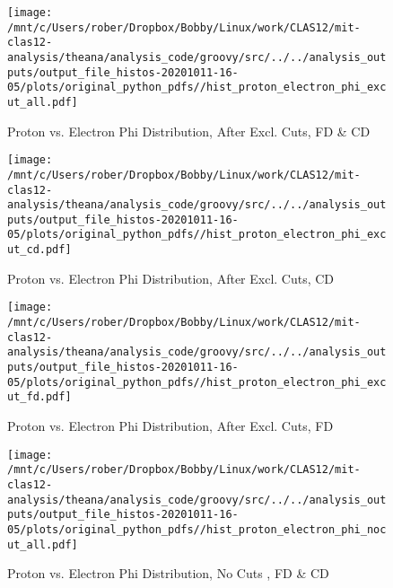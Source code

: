 \documentclass{article}
\begin{document}
\begin{landscape}
    \begin{figure}[h]
        \centering

        \texttt{[image: /mnt/c/Users/rober/Dropbox/Bobby/Linux/work/CLAS12/mit-clas12-analysis/theana/analysis\_code/groovy/src/../../analysis\_outputs/output\_file\_histos-20201011-16-05/plots/original\_python\_pdfs//hist\_proton\_electron\_phi\_excut\_all.pdf]}
        \captionsetup{textformat=empty,labelformat=blank}
        \caption{Proton vs. Electron Phi Distribution, After Excl. Cuts, FD \& CD}
    \end{figure}
    \clearpage
    
    \begin{figure}[h]
        \centering

        \texttt{[image: /mnt/c/Users/rober/Dropbox/Bobby/Linux/work/CLAS12/mit-clas12-analysis/theana/analysis\_code/groovy/src/../../analysis\_outputs/output\_file\_histos-20201011-16-05/plots/original\_python\_pdfs//hist\_proton\_electron\_phi\_excut\_cd.pdf]}
        \captionsetup{textformat=empty,labelformat=blank}
        \caption{Proton vs. Electron Phi Distribution, After Excl. Cuts, CD}
    \end{figure}
    \clearpage
    
    \begin{figure}[h]
        \centering

        \texttt{[image: /mnt/c/Users/rober/Dropbox/Bobby/Linux/work/CLAS12/mit-clas12-analysis/theana/analysis\_code/groovy/src/../../analysis\_outputs/output\_file\_histos-20201011-16-05/plots/original\_python\_pdfs//hist\_proton\_electron\_phi\_excut\_fd.pdf]}
        \captionsetup{textformat=empty,labelformat=blank}
        \caption{Proton vs. Electron Phi Distribution, After Excl. Cuts, FD}
    \end{figure}
    \clearpage
    
    \begin{figure}[h]
        \centering

        \texttt{[image: /mnt/c/Users/rober/Dropbox/Bobby/Linux/work/CLAS12/mit-clas12-analysis/theana/analysis\_code/groovy/src/../../analysis\_outputs/output\_file\_histos-20201011-16-05/plots/original\_python\_pdfs//hist\_proton\_electron\_phi\_nocut\_all.pdf]}
        \captionsetup{textformat=empty,labelformat=blank}
        \caption{Proton vs. Electron Phi Distribution, No Cuts , FD \& CD}
    \end{figure}
    \clearpage
    
    \begin{figure}[h]
        \centering


\end{figure}
\end{landscape}
\end{document}

